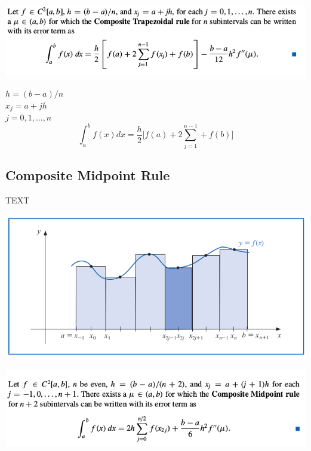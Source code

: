 \documentclass[a4paper]{article}
\begin{document}
\begin{center}
	\includegraphics[width=1\textwidth]{../additional/trapezoidal_eq.png}
	\label{fig:trap_eg}
\end{center}

$h=(b-a)/n$\\
$x_j=a+jh$\\
$j=0,1,\dots,n$\\

\begin{equation}
\int_{a}^b f(x) dx = \frac{h}{2} \Bigg[ f(a) + 2 \sum_{j=1}^{n-1} + f(b) \Bigg]
\end{equation}

 
\subsection{Composite Midpoint Rule}
TEXT

\begin{center}
	\includegraphics[width=1\textwidth]{../additional/midpoint_fig.png}
	\label{fig:mid_fig}
\end{center}

\begin{center}
	\includegraphics[width=1\textwidth]{../additional/midpoint_eq.png}
	\label{fig:mid_eq}
\end{center}
\end{document}

